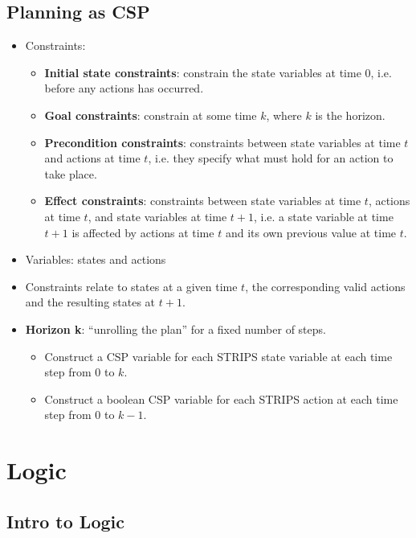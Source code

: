 \documentclass{article}
\begin{document}
\subsection{Planning as CSP}

\begin{itemize}
    \item Constraints:
        \begin{itemize}
            \item \textbf{Initial state constraints}: constrain the state variables at time 0, i.e. before any actions has occurred.
            \item \textbf{Goal constraints}: constrain at some time $k$, where $k$ is the horizon.
            \item \textbf{Precondition constraints}: constraints between state variables at time $t$ and actions at time $t$, i.e. they specify what must hold for an action to take place.
            \item \textbf{Effect constraints}: constraints between state variables at time $t$, actions at time $t$, and state variables at time $t + 1$, i.e. a state variable at time $t + 1$ is affected by actions at time $t$ and its own previous value at time $t$.
        \end{itemize}
    \item Variables: states and actions
    \item Constraints relate to states at a given time $t$, the corresponding valid actions and the resulting states at $t + 1$.
    \item \textbf{Horizon k}: ``unrolling the plan'' for a fixed number of steps.
        \begin{itemize}
            \item Construct a CSP variable for each STRIPS state variable at each time step from $0$ to $k$.
            \item Construct a boolean CSP variable for each STRIPS action at each time step from $0$ to $k - 1$.
        \end{itemize}
\end{itemize}

\section{Logic}

\subsection{Intro to Logic}
\end{document}
